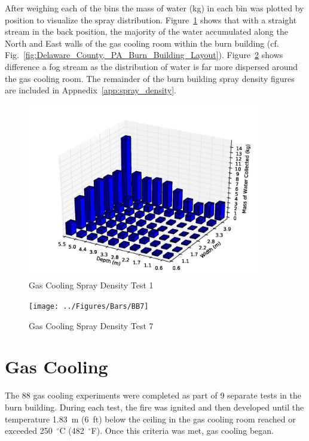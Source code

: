 \documentclass[12pt,oneside]{book}
\begin{document}
After weighing each of the bins the mass of water (kg) in each bin was plotted by position to visualize the spray distribution. Figure~\ref{fig:Burn_Building_Test_1} shows that with a straight stream in the back position, the majority of the water accumulated along the North and East walls of the gas cooling room within the burn building (cf. Fig.~\ref{fig:Delaware_County,_PA_Burn_Building_Layout}). Figure~\ref{fig:Burn_Building_Test_7} shows difference a fog stream as the distribution of water is far more dispersed around the gas cooling room. The remainder of the burn building spray density figures are included in Appnedix~\ref{app:spray_density}.

\begin{figure}[!ht]
	\includegraphics[width=4in]{../Figures/Bars/BB1}
	\caption{Gas Cooling Spray Density Test 1}
	\label{fig:Burn_Building_Test_1}
\end{figure}

\begin{figure}[!ht]
	\texttt{[image: ../Figures/Bars/BB7]}
	\caption{Gas Cooling Spray Density Test 7}
	\label{fig:Burn_Building_Test_7}
\end{figure}


\clearpage

\section{Gas Cooling}
\label{sec:Gas_Cooling}

The 88 gas cooling experiments were completed as part of 9 separate tests in the burn building. During each test, the fire was ignited and then developed until the temperature 1.83~m (6~ft) below the ceiling in the gas cooling room reached or exceeded 250~$^{\circ}$C (482~$^{\circ}$F). Once this criteria was met, gas cooling began.
\end{document}

